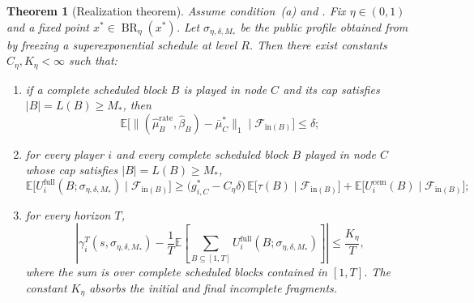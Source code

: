 \documentclass[12pt]{article}
\newtheorem{theorem}{Theorem}[section]
\theoremstyle{definition}
\newcommand{\E}{\mathbb{E}}
\newcommand{\1}{\mathbf{1}}
\newcommand{\cF}{\mathcal{F}}
\DeclareMathOperator{\BR}{BR}
\begin{document}
\begin{theorem}[Realization theorem]
\label{thm:realization}
Assume condition~\textnormal{(a)} and . Fix
$\eta\in(0,1)$ and a fixed point $x^*\in\BR_\eta(x^*)$. Let
$\sigma_{\eta,\delta,M_*}$ be the public profile obtained from
 by freezing a superexponential schedule at level $R$.
Then there exist constants $C_\eta,K_\eta<\infty$ such that:
\begin{enumerate}[label=\textnormal{(Q\arabic*)},leftmargin=2.8em]
\item if a complete scheduled block $B$ is played in node $C$ and its cap
satisfies $|B|=L(B)\ge M_*$, then
\begin{equation}
\label{eq:block-occupation-realization}
\E\bigl[\|(\widehat\mu_B^{\mathrm{rate}},\widehat\beta_B)-\bar\mu_C^*\|_1
\mid \cF_{\mathrm{in}(B)}\bigr]
\le \delta;
\end{equation}
\item for every player $i$ and every complete scheduled block $B$ played in node
$C$ whose cap satisfies $|B|=L(B)\ge M_*$,
\begin{equation}
\label{eq:block-full-payoff-realization}
\E\bigl[U_i^{\mathrm{full}}(B;\sigma_{\eta,\delta,M_*})\mid \cF_{\mathrm{in}(B)}\bigr]
\ge
\bigl(g_{i,C}^*-C_\eta\delta\bigr)\,\E\bigl[\tau(B)\mid \cF_{\mathrm{in}(B)}\bigr]
+
\E\bigl[U_i^{\mathrm{cem}}(B)\mid \cF_{\mathrm{in}(B)}\bigr];
\end{equation}
\item for every horizon $T$,
\begin{equation}
\label{eq:realization-full-tail-bound}
\left|
\gamma_i^T(s,\sigma_{\eta,\delta,M_*})
-
\frac1T\E\left[
\sum_{B\subseteq [1,T]}
U_i^{\mathrm{full}}(B;\sigma_{\eta,\delta,M_*})
\right]
\right|
\le \frac{K_\eta}{T},
\end{equation}
where the sum is over complete scheduled blocks contained in $[1,T]$. The
constant $K_\eta$ absorbs the initial and final incomplete fragments.
\end{enumerate}
\end{theorem}
\end{document}
